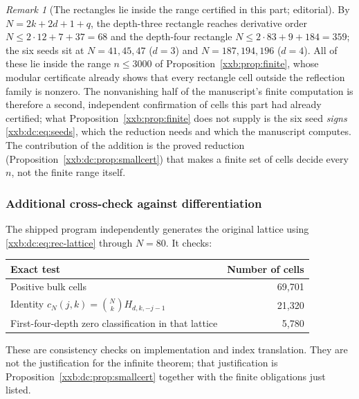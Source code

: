 \documentclass[11pt,a4paper]{article}
\numberwithin{equation}{section}
\theoremstyle{definition}
\theoremstyle{remark}
\newtheorem{remark}[theorem]{Remark}
\theoremstyle{plain}
\begin{document}
\begin{remark}[The rectangles lie inside the range certified in this part; editorial]\label{xxb:dc:rem:inside}
By $N=2k+2d+1+q$, the depth-three rectangle reaches derivative order
$N\le2\cdot12+7+37=68$ and the depth-four rectangle $N\le2\cdot83+9+184=359$;
the six seeds sit at $N=41,45,47$ ($d=3$) and $N=187,194,196$ ($d=4$).  All of these lie inside the range $n\le3000$ of
Proposition~\ref{xxb:prop:finite}, whose modular certificate already shows
that every rectangle cell outside the reflection family is nonzero.  The
nonvanishing half of the manuscript's finite computation is therefore a second,
independent confirmation of cells this part had already certified; what
Proposition~\ref{xxb:prop:finite} does not supply is the six seed
\emph{signs} \eqref{xxb:dc:eq:seeds}, which the reduction needs and which the
manuscript computes.  The contribution of the addition is the proved reduction
(Proposition~\ref{xxb:dc:prop:smallcert}) that makes a finite set of cells
decide every $n$, not the finite range itself.
\end{remark}

\subsubsection{Additional cross-check against differentiation}
The shipped program independently generates the original lattice using
\eqref{xxb:dc:eq:rec-lattice} through $N=80$.  It checks:
\begin{center}
\begin{tabular}{lr}
\toprule
Exact test & Number of cells\\
\midrule
Positive bulk cells & 69,701\\
Identity $c_N(j,k)=\binom NkH_{d,k,-j-1}$ & 21,320\\
First-four-depth zero classification in that lattice & 5,780\\
\bottomrule
\end{tabular}
\end{center}
These are consistency checks on implementation and index translation.
They are not the justification for the infinite theorem; that
justification is Proposition~\ref{xxb:dc:prop:smallcert} together with the
finite obligations just listed.
\end{document}
